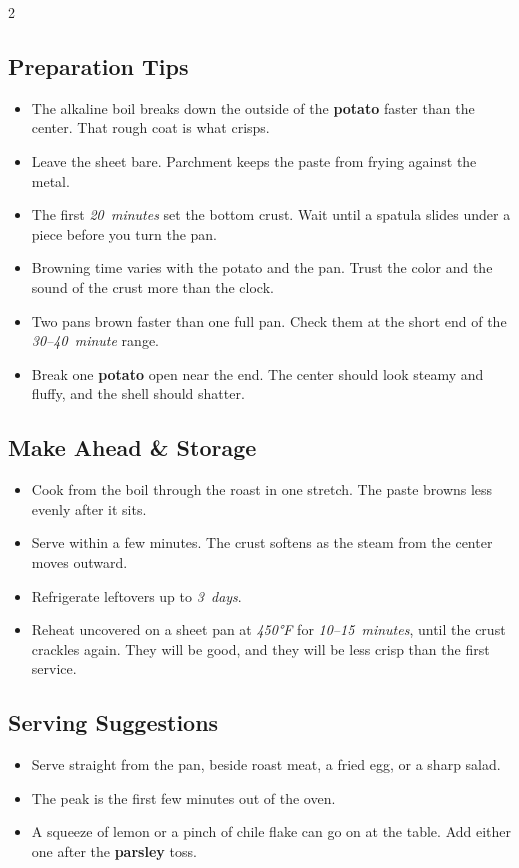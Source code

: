 \documentclass[11pt,letterpaper]{article}
\begin{document}
{\begin{multicols}{2}
\subsection*{Preparation Tips}
\begin{itemize}
    \item The alkaline boil breaks down the outside of the \textbf{potato} faster than the center. That rough coat is what crisps.
    \item Leave the sheet bare. Parchment keeps the paste from frying against the metal.
    \item The first \textit{20~minutes} set the bottom crust. Wait until a spatula slides under a piece before you turn the pan.
    \item Browning time varies with the potato and the pan. Trust the color and the sound of the crust more than the clock.
    \item Two pans brown faster than one full pan. Check them at the short end of the \textit{30--40~minute} range.
    \item Break one \textbf{potato} open near the end. The center should look steamy and fluffy, and the shell should shatter.
\end{itemize}

\subsection*{Make Ahead \& Storage}
\begin{itemize}
    \item Cook from the boil through the roast in one stretch. The paste browns less evenly after it sits.
    \item Serve within a few minutes. The crust softens as the steam from the center moves outward.
    \item Refrigerate leftovers up to \textit{3~days}.
    \item Reheat uncovered on a sheet pan at \textit{450°F} for \textit{10--15~minutes}, until the crust crackles again. They will be good, and they will be less crisp than the first service.
\end{itemize}

\subsection*{Serving Suggestions}
\begin{itemize}
    \item Serve straight from the pan, beside roast meat, a fried egg, or a sharp salad.
    \item The peak is the first few minutes out of the oven.
    \item A squeeze of lemon or a pinch of chile flake can go on at the table. Add either one after the \textbf{parsley} toss.
\end{itemize}

\end{multicols}
}
\end{document}
